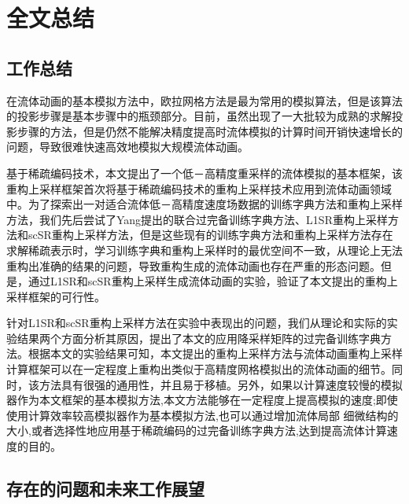 
\chapter{全文总结}%

\section{工作总结}

在流体动画的基本模拟方法中，欧拉网格方法是最为常用的模拟算法，但是该算法的投影步骤是基本步骤中的瓶颈部分。目前，虽然出现了一大批较为成熟的求解投影步骤的方法，但是仍然不能解决精度提高时流体模拟的计算时间开销快速增长的问题，导致很难快速高效地模拟大规模流体动画。

基于稀疏编码技术，本文提出了一个低－高精度重采样的流体模拟的基本框架，该重构上采样框架首次将基于稀疏编码技术的重构上采样技术应用到流体动画领域中。为了探索出一对适合流体低－高精度速度场数据的训练字典方法和重构上采样方法，我们先后尝试了Yang提出的联合过完备训练字典方法、L1SR重构上采样方法和scSR重构上采样方法，但是这些现有的训练字典方法和重构上采样方法存在求解稀疏表示时，学习训练字典和重构上采样时的最优空间不一致，从理论上无法重构出准确的结果的问题，导致重构生成的流体动画也存在严重的形态问题。但是，通过L1SR和scSR重构上采样生成流体动画的实验，验证了本文提出的重构上采样框架的可行性。

针对L1SR和scSR重构上采样方法在实验中表现出的问题，我们从理论和实际的实验结果两个方面分析其原因，提出了本文的应用降采样矩阵的过完备训练字典方法。根据本文的实验结果可知，本文提出的重构上采样方法与流体动画重构上采样计算框架可以在一定程度上重构出类似于高精度网格模拟出的流体动画的细节。同时，该方法具有很强的通用性，并且易于移植。另外，如果以计算速度较慢的模拟器作为本文框架的基本模拟方法,本文方法能够在一定程度上提高模拟的速度;即使使用计算效率较高模拟器作为基本模拟方法,也可以通过增加流体局部 细微结构的大小,或者选择性地应用基于稀疏编码的过完备训练字典方法,达到提高流体计算速度的目的。

\section{存在的问题和未来工作展望}


